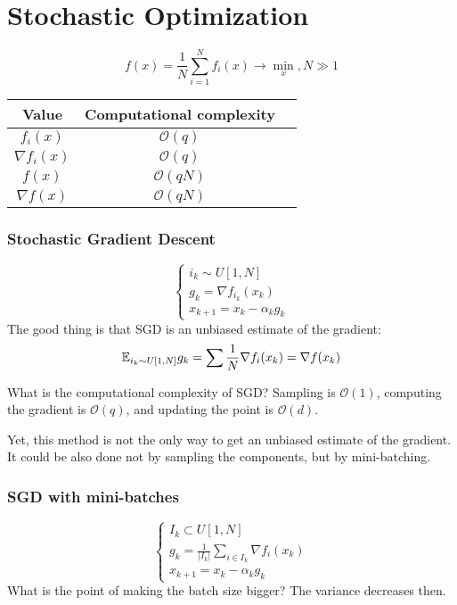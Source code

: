 \section{Stochastic Optimization}
\[ 
    f(x) = \frac{1}{N} \sum_{i=1}^N f_i(x) \to \min_x, N \gg 1
\] 

\begin{table}[!ht]
    \centering
    \begin{tabular}{c c c}
        \toprule
        \textbf{Value} & \textbf{Computational complexity} \\
        \midrule
        $f_i(x)$ & $\mathcal{O}(q)$ \\
        \midrule
        $\nabla f_i(x)$ & $\mathcal{O}(q)$ \\
        \midrule
        $f(x)$ & $\mathcal{O}(qN)$ \\
        \midrule
        $\nabla f(x)$ & $\mathcal{O}(qN)$ \\
        \bottomrule
    \end{tabular}
\end{table}

\subsubsection{Stochastic Gradient Descent}
\[ 
    \begin{cases}
        i_k \sim U[1, N] \\
        g_k = \nabla f_{i_k}(x_k) \\
        x_{k+1} = x_k - \alpha_k g_k
    \end{cases}
\] 
The good thing is that SGD is an unbiased estimate of the gradient: 
\[ 
    \mathbb{E}_{i_k \sim U[1, N]} g_k = \sum \frac{1}{N} \nabla f_i(x_k) = \nabla f(x_k)
\] 

What is the computational complexity of SGD? Sampling is $\mathcal{O}(1)$, computing the gradient is $\mathcal{O}(q)$, and updating the point is $\mathcal{O}(d)$. 

Yet, this method is not the only way to get an unbiased estimate of the gradient. It could be also done not by sampling the components, but by mini-batching.

\subsubsection{SGD with mini-batches}
\[ 
    \begin{cases}
        I_k \subset U[1, N] \\
        g_k = \frac{1}{|I_k|} \sum_{i \in I_k} \nabla f_i(x_k) \\
        x_{k+1} = x_k - \alpha_k g_k
    \end{cases}
\] 
What is the point of making the batch size bigger? The variance decreases then. 